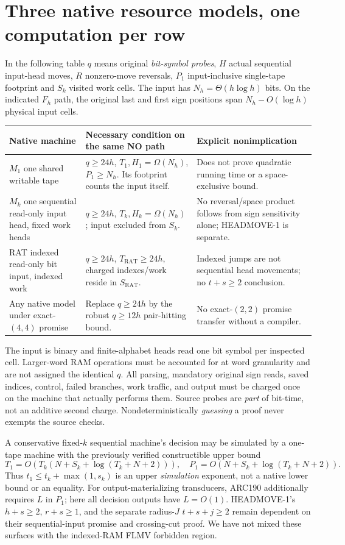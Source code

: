 \documentclass[11pt]{article}
\begin{document}
\section{Three native resource models, one computation per row}
In the following table $q$ means original \emph{bit-symbol probes}, $H$ actual sequential input-head moves, $R$ nonzero-move reversals, $P_1$ input-inclusive single-tape footprint and $S_k$ visited work cells. The input has $N_h=\Theta(h\log h)$ bits. On the indicated $F_h$ path, the original last and first sign positions span $N_h-O(\log h)$ physical input cells.
\begin{center}\small
\begin{tabularx}{\linewidth}{p{.19\linewidth}p{.42\linewidth}X}
\toprule
Native machine & Necessary condition on the same NO path & Explicit nonimplication\\\midrule
$M_1$ one shared writable tape & $q\ge24h$, $T_1,H_1=\Omega(N_h)$, $P_1\ge N_h$. Its footprint counts the input itself. & Does not prove quadratic running time or a space-exclusive bound.\\
$M_k$ one sequential read-only input head, fixed work heads & $q\ge24h$, $T_k,H_k=\Omega(N_h)$; input excluded from $S_k$. & No reversal/space product follows from sign sensitivity alone; HEADMOVE-1 is separate.\\
RAT indexed read-only bit input, indexed work & $q\ge24h$, $T_{\mathrm{RAT}}\ge24h$, charged indexes/work reside in $S_{\mathrm{RAT}}$. & Indexed jumps are not sequential head movements; no $t+s\ge2$ conclusion.\\
Any native model under exact-$(4,4)$ promise & Replace $q\ge24h$ by the robust $q\ge12h$ pair-hitting bound. & No exact-$(2,2)$ promise transfer without a compiler.\\\bottomrule
\end{tabularx}
\end{center}
The input is binary and finite-alphabet heads read one bit symbol per inspected cell. Larger-word RAM operations must be accounted for at word granularity and are not assigned the identical $q$. All parsing, mandatory original sign reads, saved indices, control, failed branches, work traffic, and output must be charged once on the machine that actually performs them. Source probes are \emph{part} of bit-time, not an additive second charge. Nondeterministically \emph{guessing} a proof never exempts the source checks.

A conservative fixed-$k$ sequential machine's decision may be simulated by a one-tape machine with the previously verified constructible upper bound
\[
T_1=O(T_k(N+S_k+\log(T_k+N+2))),\quad
P_1=O(N+S_k+\log(T_k+N+2)).\tag{6}
\]
Thus $t_1\le t_k+\max(1,s_k)$ is an upper \emph{simulation} exponent, not a native lower bound or an equality. For output-materializing transducers, ARC190 additionally requires $L$ in $P_1$; here all decision outputs have $L=O(1)$. HEADMOVE-1's $h+s\ge2$, $r+s\ge1$, and the separate radius-$J$ $t+s+j\ge2$ remain dependent on their sequential-input promise and crossing-cut proof. We have not mixed these surfaces with the indexed-RAM FLMV forbidden region.
\end{document}
